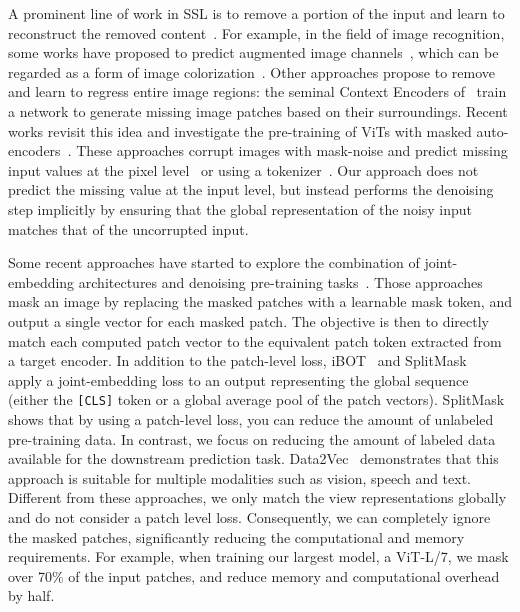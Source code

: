 \documentclass{article}
\begin{document}
A prominent line of work in SSL is to remove a portion of the input and learn to reconstruct the removed content~\citep{devlin2018bert}.
For example, in the field of image recognition, some works have proposed to predict augmented image channels~\citep{zhang2017split}, which can be regarded as a form of image colorization~\citep{zhang2016colorful,larsson2016learning,larsson2017colorization}.
Other approaches propose to remove and learn to regress entire image regions: the seminal Context Encoders of~\citet{pathak2016context} train a network to generate missing image patches based on their surroundings.
Recent works revisit this idea and investigate the pre-training of ViTs with masked auto-encoders~\citep{chen2020generative,he2021masked,xie2021simmim,wei2021masked,bao2021beit}.
These approaches corrupt images with mask-noise and predict missing input values at the pixel level~\citep{dosovitskiy2020image,he2021masked,xie2019unsupervised} or using a tokenizer~\citep{bao2021beit,wei2021masked}.
Our approach does not predict the missing value at the input level, but instead performs the denoising step implicitly by ensuring that the global representation of the noisy input matches that of the uncorrupted input.

Some recent approaches have started to explore the combination of joint-embedding architectures and denoising pre-training tasks~\citep{el2021large,baevski2022data2vec,zhou2021ibot}.
Those approaches mask an image by replacing the masked patches with a learnable mask token, and output a single vector for each masked patch.
The objective is then to directly match each computed patch vector to the equivalent patch token extracted from a target encoder.
In addition to the patch-level loss, iBOT~\citep{zhou2021ibot} and SplitMask~\citep{el2021large}  apply a joint-embedding loss to an output representing the global sequence (either the {\tt [CLS]} token or a global average pool of the patch vectors). SplitMask shows that by using a patch-level loss, you can reduce the amount of unlabeled pre-training data. In contrast, we focus on reducing the amount of labeled data available for the downstream prediction task.
Data2Vec~\citep{baevski2022data2vec} demonstrates that this approach is suitable for multiple modalities such as vision, speech and text.
Different from these approaches, we only match the view representations globally and do not consider a patch level loss.
Consequently, we can completely ignore the masked patches, significantly reducing the computational and memory requirements.
For example, when training our largest model, a ViT-L/7, we mask over 70\% of the input patches, and reduce memory and computational overhead by  half.
\end{document}
